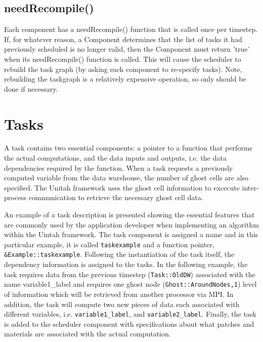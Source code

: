\documentclass[11pt,fleqn]{book} %
\begin{document}
\subsection{needRecompile()}


Each component has a needRecompile() function that is called once per
timestep.  If, for whatever reason, a Component determines that the
list of tasks it had previously scheduled is no longer valid, then the
Component must return 'true' when its needRecompile() function is
called.  This will cause the scheduler to rebuild the task graph (by
asking each component to re-specify tasks).  Note, rebuilding the
taskgraph is a relatively expensive operation, so only should be done
if necessary.

\section{Tasks}

A task contains two essential components: a pointer to a function
that performs the actual computations, and the data inputs and
outputs, i.e. the data dependencies required by the function.  When a
task requests a previously computed variable from the data warehouse,
the number of ghost cells are also specified.  The Unitah framework
uses the ghost cell information to excecute inter-process
communication to retrieve the necessary ghost cell data.

An example of a task description is presented showing the essential
features that are commonly used by the application developer when
implementing an algorithm within the Uintah framework.  The task
component is assigned a name and in this particular example, it is
called \texttt{taskexample} and a function pointer,
\texttt{\&Example::taskexample}.  Following the instantiation of the
task itself, the dependency information is assigned to the tasks.  In
the following example, the task requires data from the previous
timestep (\texttt{Task::OldDW}) associated with the name
variable1\_label and requires one ghost node
(\texttt{Ghost::AroundNodes,1}) level of information which will be
retrieved from another processor via MPI.  In addition, the task will
compute two new pieces of data each associated with different
variables, i.e. \texttt{variable1\_label}, and
\texttt{variable2\_label}.  Finally, the task is added to the scheduler
component with specifications about what patches and materials are
associated with the actual computation.
\end{document}
